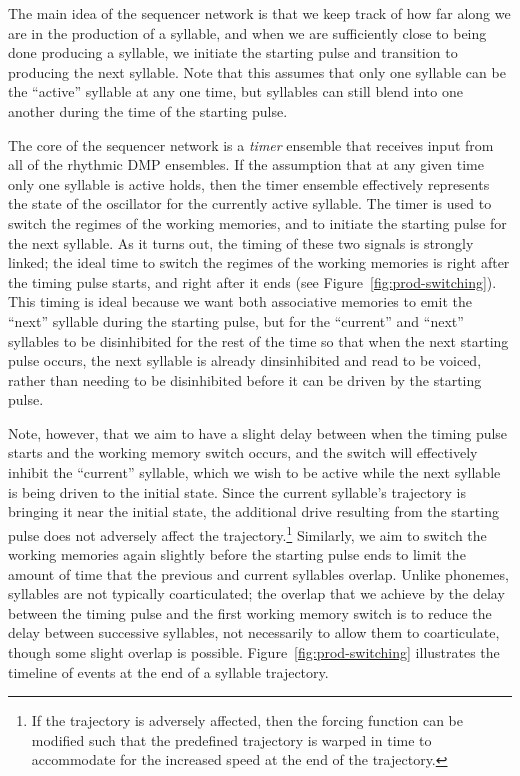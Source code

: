 The main idea of the sequencer network
is that we keep track of
how far along we are in the
production of a syllable,
and when we are sufficiently
close to being done producing a syllable,
we initiate the starting pulse
and transition to producing
the next syllable.
Note that this assumes that
only one syllable can be the
``active'' syllable at any one time,
but syllables can still
blend into one another
during the time of
the starting pulse.

The core of the sequencer network
is a \textit{timer} ensemble
that receives input from
all of the rhythmic DMP ensembles.
If the assumption that
at any given time
only one syllable is active holds,
then the timer ensemble effectively
represents the state of the oscillator
for the currently active syllable.
The timer is used to
switch the regimes of the working memories,
and to initiate the starting pulse
for the next syllable.
As it turns out, the timing
of these two signals is strongly linked;
the ideal time to switch the regimes
of the working memories
is right after the timing pulse starts,
and right after it ends
(see Figure~\ref{fig:prod-switching}).
This timing is ideal because
we want both associative memories
to emit the ``next'' syllable
during the starting pulse,
but for the ``current'' and ``next'' syllables
to be disinhibited for the rest
of the time so that when the next
starting pulse occurs,
the next syllable is already dinsinhibited
and read to be voiced,
rather than needing to be disinhibited
before it can be driven by the starting pulse.

Note, however, that we aim to
have a slight delay between
when the timing pulse starts
and the working memory switch occurs,
and the switch will effectively
inhibit the ``current'' syllable,
which we wish to be active
while the next syllable is being
driven to the initial state.
Since the current syllable's trajectory
is bringing it near the initial state,
the additional drive resulting
from the starting pulse
does not adversely affect the
trajectory.\footnote{
  If the trajectory is adversely affected,
  then the forcing function can be modified
  such that the predefined trajectory is
  warped in time to accommodate for the
  increased speed at the end of the trajectory.}
Similarly, we aim to switch
the working memories again
slightly before the starting pulse ends
to limit the amount of time
that the previous and current syllables overlap.
Unlike phonemes, syllables are not
typically coarticulated;
the overlap that we achieve by the
delay between the timing pulse
and the first working memory switch
is to reduce the delay between
successive syllables,
not necessarily to allow them
to coarticulate,
though some slight overlap is possible.
Figure~\ref{fig:prod-switching} illustrates the timeline
of events at the end of a syllable trajectory.

